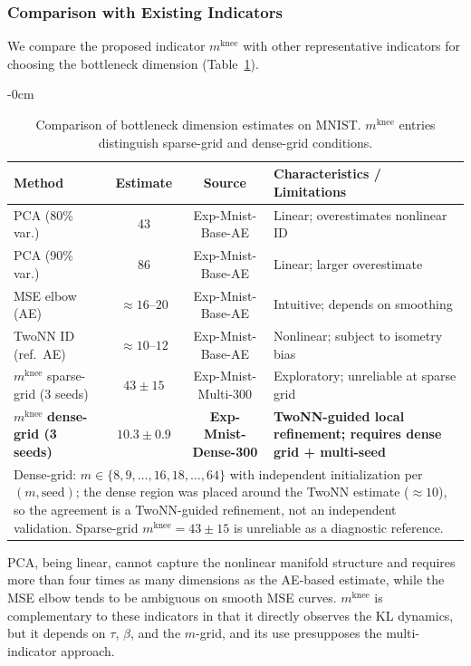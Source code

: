 \documentclass[make,article,submit,pdftex,moreauthors]{Definitions/mdpi}
\newcommand{\mknee}{m^{\mathrm{knee}}}
\begin{document}
\subsubsection{Comparison with Existing Indicators}\label{sec:exp_comparison}

We compare the proposed indicator $\mknee$ with other representative indicators for choosing
the bottleneck dimension (Table~\ref{tab:method_comparison}).

\begin{table}[H]
\begin{adjustwidth}{-\extralength}{0cm}
\centering
\caption{Comparison of bottleneck dimension estimates on MNIST. $\mknee$ entries distinguish sparse-grid and dense-grid conditions.}
\label{tab:method_comparison}
\small
\begin{tabular}{p{4.0cm}cc p{4.5cm}}
\toprule
Method & Estimate & Source & Characteristics / Limitations \\
\midrule
PCA (80\% var.) & 43 & Exp-Mnist-Base-AE & Linear; overestimates nonlinear ID \\
PCA (90\% var.) & 86 & Exp-Mnist-Base-AE & Linear; larger overestimate \\
MSE elbow (AE) & $\approx16$--$20$ & Exp-Mnist-Base-AE & Intuitive; depends on smoothing \\
TwoNN ID (ref.\ AE) & $\approx10$--$12$ & Exp-Mnist-Base-AE & Nonlinear; subject to isometry bias \\
\midrule
$\mknee$ sparse-grid (3 seeds) & $43\pm15$ & Exp-Mnist-Multi-300 & Exploratory; unreliable at sparse grid \\
$\mknee$ \textbf{dense-grid (3 seeds)} & $\boldsymbol{10.3\pm0.9}$ & \textbf{Exp-Mnist-Dense-300} & \textbf{TwoNN-guided local refinement; requires dense grid + multi-seed} \\
\midrule
\multicolumn{4}{p{13.5cm}}{\footnotesize Dense-grid: $m\in\{8,9,\ldots,16,18,\ldots,64\}$ with independent initialization per $(m,\mathrm{seed})$; the dense region was placed around the TwoNN estimate ($\approx10$), so the agreement is a TwoNN-guided refinement, not an independent validation. Sparse-grid $\mknee=43\pm15$ is unreliable as a diagnostic reference.} \\
\bottomrule
\end{tabular}
\end{adjustwidth}
\end{table}

PCA, being linear, cannot capture the nonlinear manifold structure and requires more than
four times as many dimensions as the AE-based estimate, while the MSE elbow tends to be
ambiguous on smooth MSE curves.
$\mknee$ is complementary to these indicators in that it directly observes the KL dynamics,
but it depends on $\tau$, $\beta$, and the $m$-grid, and its use presupposes the
multi-indicator approach.
\end{document}
